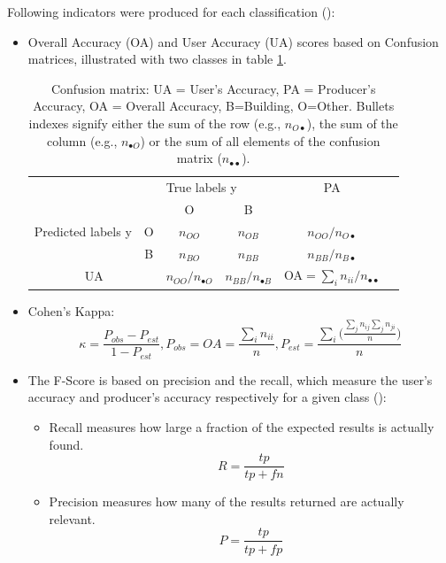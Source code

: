 \documentclass[10pt]{article}
\begin{document}
Following indicators were produced for each classification (\cite{deMorsier}):
\begin{itemize}
    \item Overall Accuracy (OA) and User Accuracy (UA) scores based on Confusion matrices, illustrated with two classes in table \ref{table:cm}.
    \begin{table}[H]
		\centering
		\begin{tabular}{cc|c|c|cl}
			& & \multicolumn{2}{l|}{True labels y}&PA\\
			\multirow{3}{*}{Predicted labels y} &  & O& B  &\\ \cline{1-5} 
			& O &  $n_{OO}$ & $n_{OB}$ &$n_{OO}/n_{O\bullet}$\\ \cline{2-5} 
			& B & $n_{BO}$ & $n_{BB}$  &$n_{BB}/n_{B\bullet}$\\ \cline{1-5} 
			\multicolumn{2}{c|}{UA} & $n_{OO}/n_{\bullet O}$ & $n_{BB}/n_{\bullet B}$&OA$=\sum_in_{ii}/n_{\bullet\bullet}$\\
		\end{tabular}
		\caption{Confusion matrix: UA = User's Accuracy, PA = Producer's Accuracy, OA = Overall Accuracy, B=Building, O=Other. Bullets indexes signify either the sum of the row (e.g., $n_{O\bullet}$), the sum of the column (e.g., $n_{\bullet O}$) or the sum of all elements of the confusion matrix ($n_{\bullet\bullet}$).}
		\label{table:cm}
	\end{table}
	\item Cohen's Kappa:
	\begin{equation}
	    \kappa=\frac{P_{obs}-P_{est}}{1-P_{est}},P_{obs}=OA=\frac{\sum_in_{ii}}{n}, P_{est}=\frac{\sum_i\big(\frac{\sum_jn_{ij}\sum_jn_{ji}}{n}\big)}{n}
	\end{equation}
	\item The F-Score is based on precision and the recall, which measure the user's accuracy and producer's accuracy respectively for a given class (\cite{zhang_f-measure_2009,ting_precision_2011}):
	\begin{itemize}
	    \item Recall measures how large a fraction of the expected results is actually found.
	    \begin{equation}
	        R=\frac{tp}{tp+fn}
	    \end{equation}
	    \item Precision measures how many of the results returned are actually relevant.
	    \begin{equation}
	        P=\frac{tp}{tp+fp}
	    \end{equation}

\end{itemize}
\end{itemize}
\end{document}
